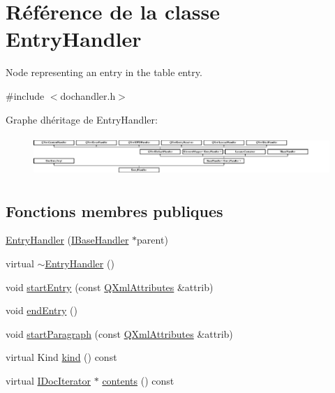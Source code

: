 \hypertarget{class_entry_handler}{}\section{Référence de la classe Entry\+Handler}
\label{class_entry_handler}


Node representing an entry in the table entry.  




{\ttfamily \#include $<$dochandler.\+h$>$}

Graphe d\textquotesingle{}héritage de Entry\+Handler\+:\begin{figure}[H]
\begin{center}
\leavevmode
\includegraphics[height=1.545894cm]{class_entry_handler}
\end{center}
\end{figure}
\subsection*{Fonctions membres publiques}
\begin{DoxyCompactItemize}
\item 
\hyperlink{class_entry_handler_a41c4849c06cfd1fcbe2b8a2a3a3a696d}{Entry\+Handler} (\hyperlink{class_i_base_handler}{I\+Base\+Handler} $\ast$parent)
\item 
virtual \hyperlink{class_entry_handler_a439dd97fd68a507da1c371117157e964}{$\sim$\+Entry\+Handler} ()
\item 
void \hyperlink{class_entry_handler_ac0bbcdb201c9d3afafa0cd346c333b08}{start\+Entry} (const \hyperlink{class_q_xml_attributes}{Q\+Xml\+Attributes} \&attrib)
\item 
void \hyperlink{class_entry_handler_ae4e7fb47298a901beb6435aefecd10e2}{end\+Entry} ()
\item 
void \hyperlink{class_entry_handler_abdddf2afd859afbd15aaeb33587de58c}{start\+Paragraph} (const \hyperlink{class_q_xml_attributes}{Q\+Xml\+Attributes} \&attrib)
\item 
virtual Kind \hyperlink{class_entry_handler_ac059a62c939acb023c8b51f2fdd58a7a}{kind} () const 
\item 
virtual \hyperlink{class_i_doc_iterator}{I\+Doc\+Iterator} $\ast$ \hyperlink{class_entry_handler_a3922d6c8ad1b8774396b5cc8770e1c2d}{contents} () const 
\end{DoxyCompactItemize}
